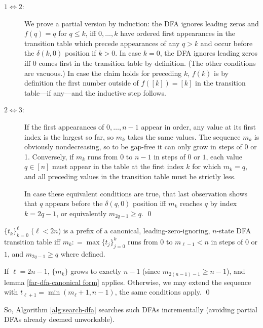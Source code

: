 \begin{description}
  \item[$1\iff 2$:]
        We prove a partial version by induction:
        the DFA ignores leading zeros and $f(q)=q$ for $q\le k$,
        iff $0,\ldots,k$ have ordered first appearances in the transition table
        which precede appearances of any $q>k$
        and occur before the $\delta(k,0)$ position if $k>0$.
        In case $k=0$, the DFA ignores leading zeros iff $0$ comes first in the transition table by definition.
        (The other conditions are vacuous.)
        In case the claim holds for preceding $k$, $f(k)$ is by definition the first number outside of $f([k])=[k]$ in the transition table---if any---and the inductive step follows.
  \item[$2\iff 3$:]
        If the first appearances of $0,\ldots,n-1$ appear in order, any value at its first index is the largest so far, so $m_k$ takes the same values. The sequence $m_k$ is obviously nondecreasing, so to be gap-free it can only grow in steps of 0 or 1.
        Conversely, if $m_k$ runs from $0$ to $n-1$ in steps of $0$ or $1$, each value $q\in [n]$ must appear in the table at the first index $k$ for which $m_k=q$, and all preceding values in the transition table must be strictly less.

        In case these equivalent conditions are true, that last observation shows that $q$ appears before the $\delta(q,0)$ position iff $m_k$ reaches $q$ by index $k=2q-1$, or equivalently $m_{2q-1}\ge q$.
        \qed
\end{description}

\begin{corollary}
  $\{t_k\}_{k=0}^\ell$ ($\ell<2n$) is a prefix of a canonical, leading-zero-ignoring, $n$-state DFA transition table iff
  $m_k \mathrel{\mathop:}= \max\{t_j\}_{j=0}^k$ runs from $0$ to $m_{\ell-1}<n$ in steps of $0$ or $1$, and $m_{2q-1}\ge q$ where defined.
\end{corollary}
\proof
If $\ell=2n-1$, $\{m_k\}$ grows to exactly $n-1$ (since $m_{2(n-1)-1}\ge n-1$), and lemma \ref{far-dfa-canonical form} applies.
Otherwise, we may extend the sequence with $t_{\ell+1}=\min(m_\ell+1,n-1)$, the same conditions apply.
\qed

So, Algorithm \ref{alg:search-dfa} searches such DFAs incrementally (avoiding partial DFAs already deemed unworkable).

